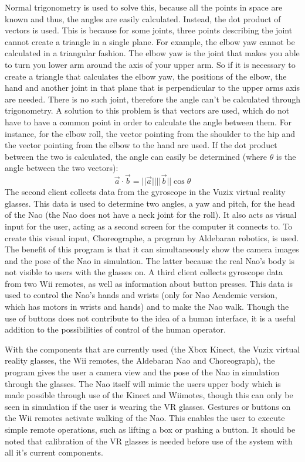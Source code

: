 \documentclass[11pt,a4paper,oneside]{article}
\begin{document}
Normal trigonometry is used to solve this, because all the points in space are known and thus, the angles are easily calculated. Instead, the dot product of vectors is used. This is because for some joints, three points describing the joint cannot create a triangle in a single plane. For example, the elbow yaw cannot be calculated in a triangular fashion. The elbow yaw is the joint that makes you able to turn you lower arm around the axis of your upper arm. So if it is necessary to create a triangle that calculates the elbow yaw, the positions of the elbow, the hand and another joint in that plane that is perpendicular to the upper arms axis are needed. There is no such joint, therefore the angle can’t be calculated through trigonometry. A solution to this problem is that vectors are used, which do not have to have a common point in order to calculate the angle between them. For instance, for the elbow roll, the vector pointing from the shoulder to the hip and the vector pointing from the elbow to the hand are used. If the dot product between the two is calculated, the angle can easily be determined (where $\theta$ is the angle between the two vectors):
$$ \vec{a} \cdot \vec{b} = ||\vec{a}|| ||\vec{b}|| \cos{\theta}$$
The second client collects data from the gyroscope in the Vuzix virtual reality glasses. This data is used to determine two angles, a yaw and pitch, for the head of the Nao (the Nao does not have a neck joint for the roll). It also acts as visual input for the user, acting as a second screen for the computer it connects to.
To create this visual input, Choreographe, a program by Aldebaran robotics, is used. The benefit of this program is that it can simultaneously show the camera images and the pose of the Nao in simulation. The latter because the real Nao’s body is not visible to users with the glasses on.
A third client collects gyroscope data from two Wii remotes, as well as information about button presses. This data is used to control the Nao’s hands and wrists (only for Nao Academic version, which has motors in wrists and hands) and to make the Nao walk. Though the use of buttons does not contribute to the idea of a human interface, it is a useful addition to the possibilities of control of the human operator.

With the components that are currently used (the Xbox Kinect, the Vuzix virtual reality glasses, the Wii remotes, the Aldebaran Nao and Choreograph), the program gives the user a camera view and the pose of the Nao in simulation through the glasses. The Nao itself will mimic the users upper body which is made possible through use of the Kinect and Wiimotes, though this can only be seen in simulation if the user is wearing the VR glasses. Gestures or buttons on the Wii remotes activate walking of the Nao. This enables the user to execute simple remote operations, such as lifting a box or pushing a button. It should be noted that calibration of the VR glasses is needed before use of the system with all it’s current components.
\end{document}
